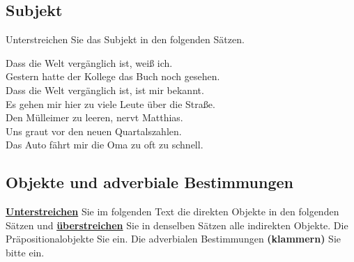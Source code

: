 \documentclass[12pt,a4paper,twoside]{article}
\newcommand{\FUBreak}{\clearpage}
\newcommand{\FUZeile}{\hspace{\baselineskip}}
\newcommand{\FUBreak}{}
\newcommand{\FUZeile}{}
\newcommand*{\mybox}[1]{\framebox{#1}}
\newcommand\ol[1]{{\setul{-0.9em}{}\ul{#1}}}
\begin{document}
\FUZeile

\subsection{Subjekt}

Unterstreichen Sie das Subjekt in den folgenden Sätzen.

\begin{exe}
  \setcounter{xnumi}{0}
  \ex Dass die Welt vergänglich ist, weiß ich.\\

  \ex Gestern hatte der Kollege das Buch noch gesehen.\\

  \ex Dass die Welt vergänglich ist, ist mir bekannt.\\

  \ex Es gehen mir hier zu viele Leute über die Straße.\\

  \ex Den Mülleimer zu leeren, nervt Matthias.\\

  \ex Uns graut vor den neuen Quartalszahlen.\\

  \ex Das Auto fährt mir die Oma zu oft zu schnell.\\

\end{exe}

\FUBreak

\subsection{Objekte und adverbiale Bestimmungen}

\textbf{\ul{Unterstreichen}} Sie im folgenden Text die direkten Objekte in den folgenden Sätzen und \textbf{\ol{überstreichen}} Sie in denselben Sätzen alle indirekten Objekte. Die Präpositionalobjekte \textbf{\mybox{rahmen}} Sie ein.
Die adverbialen Bestimmungen \textbf{(klammern)} Sie bitte ein.
\end{document}
